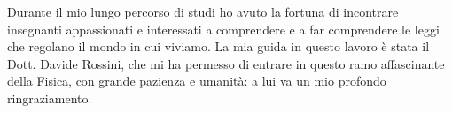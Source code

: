 \documentclass[
12pt, %
english, %
onehalfspacing, %
nohyperref, %
headsepline, %
]{MastersDoctoralThesis} %
\begin{document}
\begin{acknowledgements}
\addchaptertocentry{\acknowledgementname} %

Durante il mio lungo percorso di studi ho avuto la fortuna di incontrare insegnanti appassionati e interessati a comprendere e a far comprendere le leggi che regolano il mondo in cui viviamo. La mia guida in questo lavoro è stata il Dott. Davide Rossini, che mi ha permesso di entrare in questo ramo affascinante della Fisica, con grande pazienza e umanità: a lui va un mio profondo ringraziamento.

\end{acknowledgements}
\end{document}
